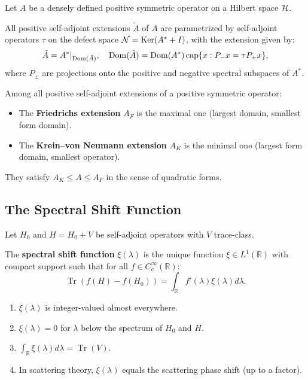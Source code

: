 Let $A$ be a densely defined positive symmetric operator on a Hilbert space $\mathcal{H}$.

\begin{theorem}
All positive self-adjoint extensions $\tilde A$ of $A$ are parametrized by self-adjoint operators $\tau$ on the defect space $\mathcal{N} = \operatorname{Ker}(A^* + I)$, with the extension given by:
\[
\tilde A = A^*|_{\operatorname{Dom}(\tilde A)}, \quad \operatorname{Dom}(\tilde A) = \operatorname{Dom}(A^*) \operatorname{\mathrm{cap}} \{x : P_- x = \tau P_+ x\},
\]
where $P_\pm$ are projections onto the positive and negative spectral subspaces of $A^*$.
\end{theorem}

\begin{theorem}
Among all positive self-adjoint extensions of a positive symmetric operator:
\begin{itemize}
    \item The \textbf{Friedrichs extension} $A_F$ is the maximal one (largest domain, smallest form domain).
    \item The \textbf{Krein--von Neumann extension} $A_K$ is the minimal one (largest form domain, smallest operator).
\end{itemize}
They satisfy $A_K \leq A \leq A_F$ in the sense of quadratic forms.
\end{theorem}

\subsection{The Spectral Shift Function}

Let $H_0$ and $H = H_0 + V$ be self-adjoint operators with $V$ trace-class.

\begin{definition}
The \textbf{spectral shift function} $\xi(\lambda)$ is the unique function $\xi \in L^1(\mathbb{R})$ with compact support such that for all $f \in C_c^\infty(\mathbb{R})$:
\[
\operatorname{Tr}(f(H) - f(H_0)) = \int_{\mathbb{R}} f'(\lambda) \xi(\lambda) d\lambda.
\]
\end{definition}

\begin{theorem}[Properties]
\begin{enumerate}
    \item $\xi(\lambda)$ is integer-valued almost everywhere.
    \item $\xi(\lambda) = 0$ for $\lambda$ below the spectrum of $H_0$ and $H$.
    \item $\int_{\mathbb{R}} \xi(\lambda) d\lambda = \operatorname{Tr}(V)$.
    \item In scattering theory, $\xi(\lambda)$ equals the scattering phase shift (up to a factor).
\end{enumerate}
\end{theorem}


